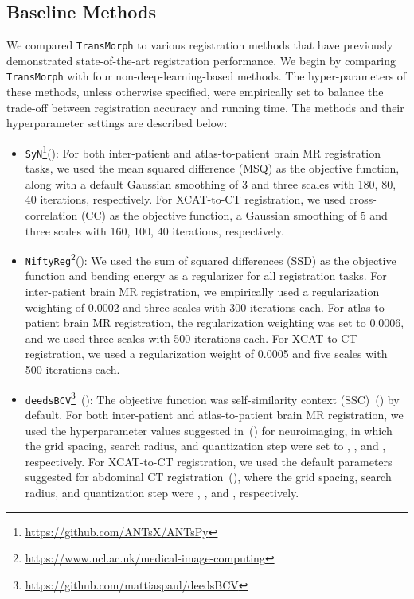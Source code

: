 \documentclass[times,twocolumn,final]{elsarticle}
\begin{document}
\subsection{Baseline Methods}
We compared \texttt{TransMorph} to various registration methods that have previously demonstrated state-of-the-art registration performance. We begin by comparing \texttt{TransMorph} with four non-deep-learning-based methods. The hyper-parameters of these methods, unless otherwise specified, were empirically set to balance the trade-off between registration accuracy and running time. The methods and their hyperparameter settings are described below: 
\begin{itemize}[noitemsep]
    \item \texttt{SyN}\footnote{\url{https://github.com/ANTsX/ANTsPy}}(\cite{avants2008symmetric}): For both inter-patient and atlas-to-patient brain MR registration tasks, we used the mean squared difference (MSQ) as the objective function, along with a default Gaussian smoothing of 3 and three scales with 180, 80, 40 iterations, respectively. For XCAT-to-CT registration, we used cross-correlation (CC) as the objective function, a Gaussian smoothing of 5 and three scales with 160, 100, 40 iterations, respectively.
    \item \texttt{NiftyReg}\footnote{\url{https://www.ucl.ac.uk/medical-image-computing}}(\cite{modat2010fast}): We used the sum of squared differences (SSD) as the objective function and bending energy as a regularizer for all registration tasks. For inter-patient brain MR registration, we empirically used a regularization weighting of 0.0002 and three scales with 300 iterations each. For atlas-to-patient brain MR registration, the regularization weighting was set to 0.0006, and we used three scales with 500 iterations each. For XCAT-to-CT registration, we used a regularization weight of 0.0005 and five scales with 500 iterations each.
    \item \texttt{deedsBCV}\footnote{\url{https://github.com/mattiaspaul/deedsBCV}}~(\cite{heinrich2015multi}): The objective function was self-similarity context (SSC)~(\cite{heinrich2013towards}) by default. For both inter-patient and atlas-to-patient brain MR registration, we used the hyperparameter values suggested in~(\cite{hoffmann2020learning}) for neuroimaging, in which the grid spacing, search radius, and quantization step were set to , , and , respectively. For XCAT-to-CT registration, we used the default parameters suggested for abdominal CT registration~(\cite{heinrich2015multi}), where the grid spacing, search radius, and quantization step were , , and , respectively.

\end{itemize}
\end{document}
